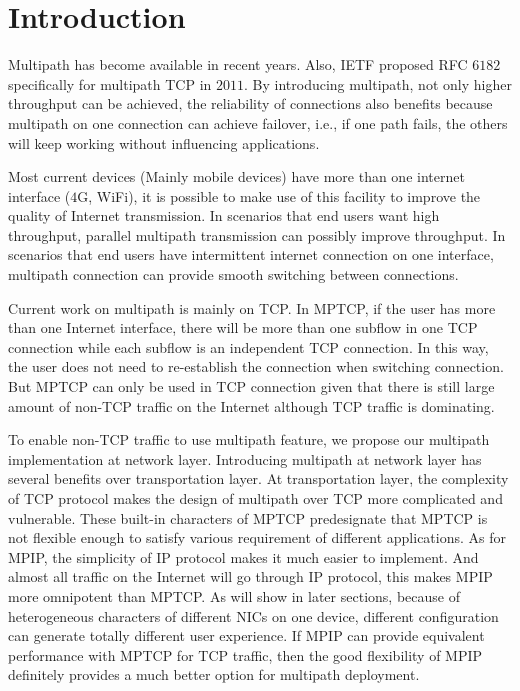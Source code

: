 \section{Introduction}
\label{sec:intro}
Multipath has become available in recent years. Also, IETF proposed RFC $6182$ specifically for multipath TCP in $2011$. By introducing multipath, not only higher throughput can be achieved, the reliability of connections also benefits because multipath on one connection can achieve failover, i.e., if one path fails, the others will keep working without influencing applications.

Most current devices (Mainly mobile devices) have more than one internet interface ($4$G, WiFi), it is possible to make use of this facility to improve the quality of Internet transmission. In scenarios that end users want high throughput, parallel multipath transmission can possibly improve throughput. In scenarios that end users have intermittent internet connection on one interface, multipath connection can provide smooth switching between connections.

Current work on multipath is mainly on TCP. In MPTCP, if the user has more than one Internet interface, there will be more than one subflow in one TCP connection while each subflow is an independent TCP connection. In this way, the user does not need to re-establish the connection when switching connection. But MPTCP can only be used in TCP connection given that there is still large amount of non-TCP traffic on the Internet although TCP traffic is dominating.

To enable non-TCP traffic to use multipath feature, we propose our multipath implementation at network layer. Introducing multipath at network layer has several benefits over transportation layer. At transportation layer, the complexity of TCP protocol makes the design of multipath over TCP more complicated and vulnerable. These built-in characters of MPTCP predesignate that MPTCP is not flexible enough to satisfy various requirement of different applications. As for MPIP, the simplicity of IP protocol makes it much easier to implement. And almost all traffic on the Internet will go through IP protocol, this makes MPIP more omnipotent than MPTCP. As will show in later sections, because of heterogeneous characters of different NICs on one device, different configuration can generate totally different user experience. If MPIP can provide equivalent performance with MPTCP for TCP traffic, then the good flexibility of MPIP definitely provides a much better option for multipath deployment.

